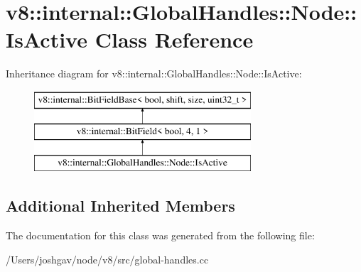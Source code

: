 \hypertarget{classv8_1_1internal_1_1_global_handles_1_1_node_1_1_is_active}{}\section{v8\+:\+:internal\+:\+:Global\+Handles\+:\+:Node\+:\+:Is\+Active Class Reference}
\label{classv8_1_1internal_1_1_global_handles_1_1_node_1_1_is_active}
Inheritance diagram for v8\+:\+:internal\+:\+:Global\+Handles\+:\+:Node\+:\+:Is\+Active\+:\begin{figure}[H]
\begin{center}
\leavevmode
\includegraphics[height=3.000000cm]{classv8_1_1internal_1_1_global_handles_1_1_node_1_1_is_active}
\end{center}
\end{figure}
\subsection*{Additional Inherited Members}


The documentation for this class was generated from the following file\+:\begin{DoxyCompactItemize}
\item 
/\+Users/joshgav/node/v8/src/global-\/handles.\+cc\end{DoxyCompactItemize}
